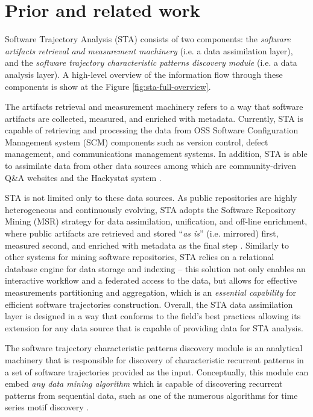 \chapter{Prior and related work}\label{chapter_background_work}
Software Trajectory Analysis (STA) consists of two components: 
the \textit{software artifacts retrieval and measurement machinery} (i.e. a data assimilation layer), 
and the \textit{software trajectory characteristic patterns discovery module} (i.e. a data analysis layer). 
A high-level overview of the information flow through these components is show at the 
Figure \ref{fig:sta-full-overview}.

The artifacts retrieval and measurement machinery refers to a way that software artifacts are collected, 
measured, and enriched with metadata. 
Currently, STA is capable of retrieving and processing the data from OSS Software 
Configuration Management system (SCM) components such as version control, 
defect management, and communications management systems. 
In addition, STA is able to assimilate data from other data sources among which are community-driven 
Q\&A websites and the Hackystat system \cite{csdl2-10-09}.

STA is not limited only to these data sources.
As public repositories are highly heterogeneous and continuously evolving, STA adopts the 
Software Repository Mining (MSR) strategy for data assimilation, unification, and off-line enrichment,
where public artifacts are retrieved and stored ``\textit{as is}'' (i.e. mirrored) first, 
measured second, and enriched with metadata as the final step 
\cite{citeulike:12550438} \cite{german04_softchange} \cite{cvsanaly}.
Similarly to other systems for mining software repositories, STA relies on a relational database engine 
for data storage and indexing -- this solution not only enables an interactive workflow and a federated 
access to the data, but allows for effective measurements partitioning and aggregation, which is 
an \textit{essential capability} for efficient software trajectories construction.
Overall, the STA data assimilation layer is designed in a way that conforms to the field's best practices
allowing its extension for any data source that is capable of providing data for STA analysis.

The software trajectory characteristic patterns discovery module is an analytical machinery that 
is responsible for discovery of characteristic recurrent patterns in a set of software trajectories provided as 
the input. Conceptually, this module can embed \textit{any data mining algorithm} which is capable of 
discovering recurrent patterns from sequential data, such as one of the numerous algorithms for time series 
motif discovery \cite{citeulike:13197378}.

